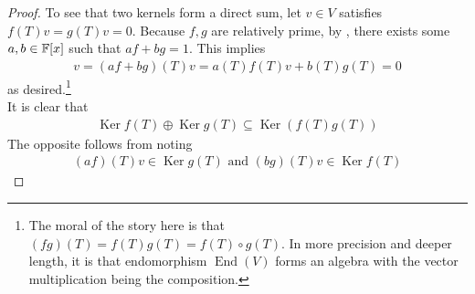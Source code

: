 \documentclass{report}
\begin{document}
\begin{proof}
To see that two kernels form a direct sum, let $v \in V$ satisfies $f(T)v=g(T)v=0$. Because $f,g$ are relatively prime, by , there exists some $a,b \in \mathbb{F}[x]$ such that $af+bg=1$. This implies 
\begin{align*}
v=(af+bg)(T)v= a(T)f(T)v + b(T)g(T)= 0
\end{align*}
as desired.\footnote{The moral of the story here is that $(fg)(T)=f(T)g(T)=f(T)\circ g(T)$. In more precision and deeper length, it is that endomorphism $\operatorname{End}(V)$ forms an algebra with the vector multiplication being the composition.} \\

It is clear that 
\begin{align*}
\operatorname{Ker}f(T)\oplus  \operatorname{Ker}g(T)\subseteq \operatorname{Ker}(f(T)g(T)) 
\end{align*}
The opposite follows from noting 
\begin{align*}
  (af)(T)v \in \operatorname{Ker}g(T) \text{ and }(bg)(T)v \in \operatorname{Ker}f(T)
\end{align*}
\end{proof}
\end{document}
